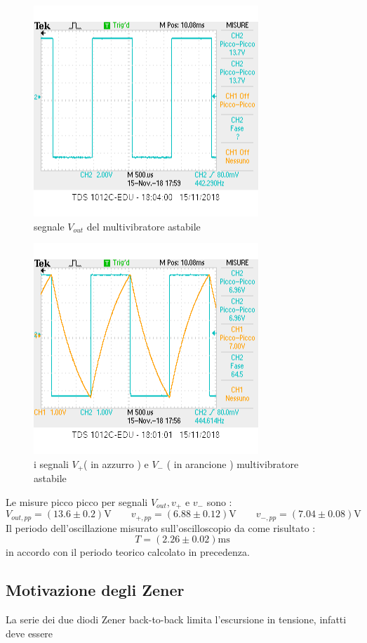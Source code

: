 \documentclass[10pt,a4paper]{article}
\begin{document}
 
 \begin{figure}[h]
 	\centering
 		\includegraphics[scale=0.8]{vout_punto2.png}
 		\caption{\small segnale $V_{out}$ del multivibratore astabile }
 		\label{fig:V_out}
 \end{figure}
 
 \begin{figure}[h]
 	\centering
 		\includegraphics[scale=0.8]{v+_v-.png}
 		\caption{\small i segnali $V_+$( in azzurro ) e $ V_-$ ( in arancione )  multivibratore astabile}
 		\label{fig:V+V-}
 \end{figure}
Le misure picco picco per  segnali  $V_{out}, v_{+}$ e $v_{-}$ sono :
\[ V_{out,pp}= (13.6\pm 0.2)\si{\volt} \qquad  v_{+,pp}= (6.88 \pm 0.12)\si{\volt} \qquad   v_{-,pp}= ( 7.04 \pm0.08 ) \si{\volt}\]
Il periodo dell'oscillazione misurato sull'oscilloscopio da come risultato :
\[ T = (2.26 \pm 0.02)\si{\milli \second}\]
in accordo con il periodo teorico calcolato in precedenza.

\subsection{Motivazione degli Zener} 
La serie dei due  diodi  Zener back-to-back limita l'escursione in tensione, infatti deve essere
\end{document}
